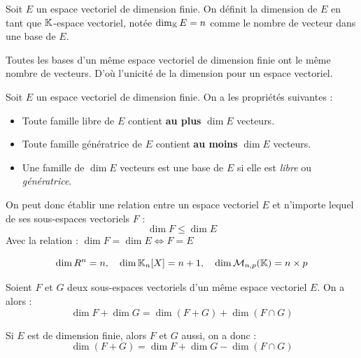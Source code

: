 \begin{definition}[Dimension]
    Soit $E$ un espace vectoriel de dimension finie. 
    On définit la dimension de $E$ en tant que $\mathbb{K}$-espace vectoriel, notée $ \dim_{\mathbb{K}} E = n$
    comme le nombre de vecteur dans une base de $E$. 
\end{definition}

\begin{remark}
    Toutes les bases d'un même espace vectoriel de dimension finie ont le même nombre de vecteurs. 
    D'où l'unicité de la dimension pour un espace vectoriel. 
\end{remark}

\begin{prop}[Dimension]
    Soit $E$ un espace vectoriel de dimension finie. On a les propriétés suivantes : 
    \begin{itemize}
        \item Toute famille libre de $E$ contient \textbf{au plus} $\dim E$ vecteurs. 
        \item Toute famille génératrice de $E$ contient \textbf{au moins} $\dim E$ vecteurs. 
        \item Une famille de $\dim E$ vecteurs est une base de $E$ si elle est \emph{libre} ou \emph{génératrice}. 
    \end{itemize}
\end{prop}

\begin{proposition}
    On peut donc établir une relation entre un espace vectoriel $E$ et n'importe lequel de ses sous-espaces vectoriels $F$ : 
        \[ \dim F \leqslant \dim E \] 
    Avec la relation : $\dim F = \dim E \iff F = E $
\end{proposition}

\begin{example}
    \[ \dim R^n = n, \quad \dim \mathbb{K}_{n}[X] = n + 1, \quad \dim \mathcal{M}_{n,p}(\mathbb{K}) = n \times p \] 
\end{example}

\begin{theorem}
    Soient $F$ et $G$ deux sous-espaces vectoriels d'un même espace vectoriel $E$. 
    On a alors : 
        \[ \boxed{\dim F + \dim G = \dim (F + G) + \dim (F \cap G)} \] 
\end{theorem}

Si $E$ est de dimension finie, alors $F$ et $G$ aussi, on a donc : 
    \[ \dim (F + G) = \dim F + \dim G - \dim (F \cap G) \] 

















